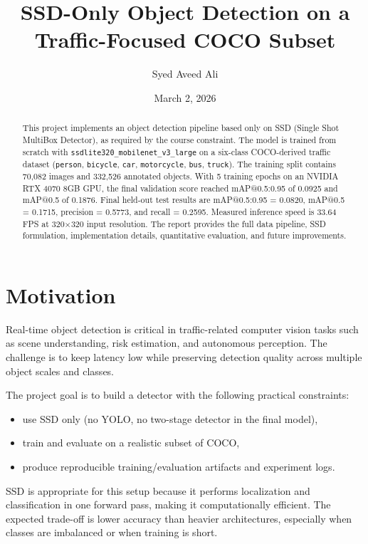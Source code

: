 ﻿\documentclass[11pt]{article}
\title{SSD-Only Object Detection on a Traffic-Focused COCO Subset}
\author{Syed Aveed Ali}
\date{March 2, 2026}
\begin{document}
\maketitle

\begin{abstract}
This project implements an object detection pipeline based only on SSD (Single Shot MultiBox Detector), as required by the course constraint. The model is trained from scratch with \texttt{ssdlite320\_mobilenet\_v3\_large} on a six-class COCO-derived traffic dataset (\texttt{person}, \texttt{bicycle}, \texttt{car}, \texttt{motorcycle}, \texttt{bus}, \texttt{truck}). The training split contains 70,082 images and 332,526 annotated objects. With 5 training epochs on an NVIDIA RTX 4070 8GB GPU, the final validation score reached mAP@0.5:0.95 of 0.0925 and mAP@0.5 of 0.1876. Final held-out test results are mAP@0.5:0.95 = 0.0820, mAP@0.5 = 0.1715, precision = 0.5773, and recall = 0.2595. Measured inference speed is 33.64 FPS at 320\(\times\)320 input resolution. The report provides the full data pipeline, SSD formulation, implementation details, quantitative evaluation, and future improvements.
\end{abstract}

\section{Motivation}
Real-time object detection is critical in traffic-related computer vision tasks such as scene understanding, risk estimation, and autonomous perception. The challenge is to keep latency low while preserving detection quality across multiple object scales and classes.

The project goal is to build a detector with the following practical constraints:
\begin{itemize}
    \item use SSD only (no YOLO, no two-stage detector in the final model),
    \item train and evaluate on a realistic subset of COCO,
    \item produce reproducible training/evaluation artifacts and experiment logs.
\end{itemize}

SSD is appropriate for this setup because it performs localization and classification in one forward pass, making it computationally efficient. The expected trade-off is lower accuracy than heavier architectures, especially when classes are imbalanced or when training is short.
\end{document}
